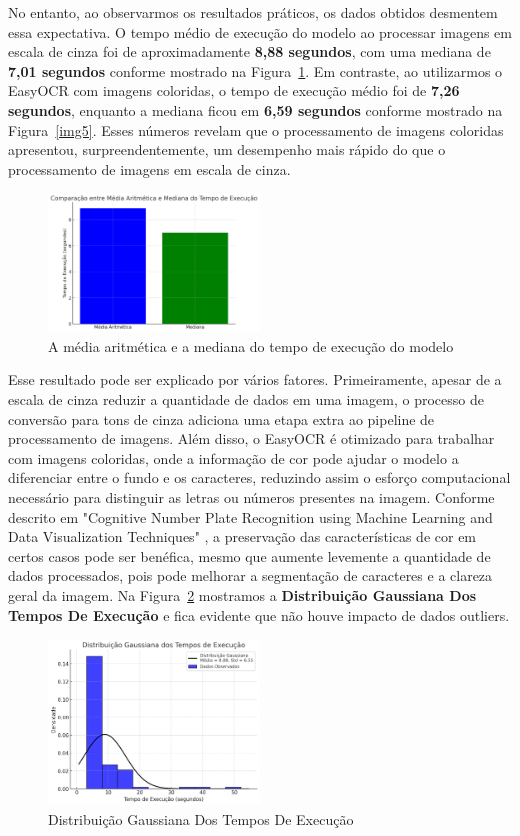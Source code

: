 \documentclass[conference]{IEEEtran}
\begin{document}
No entanto, ao observarmos os resultados práticos, os dados obtidos desmentem essa expectativa. O tempo médio de execução do modelo ao processar imagens em escala de cinza foi de aproximadamente \textbf{8,88 segundos}, com uma mediana de \textbf{7,01 segundos} conforme mostrado na Figura~\ref{img8}. Em contraste, ao utilizarmos o EasyOCR com imagens coloridas, o tempo de execução médio foi de \textbf{7,26 segundos}, enquanto a mediana ficou em \textbf{6,59 segundos} conforme mostrado na Figura~\ref{img5}. Esses números revelam que o processamento de imagens coloridas apresentou, surpreendentemente, um desempenho mais rápido do que o processamento de imagens em escala de cinza.

\begin{figure}[htbp]
	\centerline{\includegraphics[width=0.5\textwidth]{img8.png}}
	\caption{A média aritmética e a mediana do tempo de execução do modelo}
	\label{img8}
\end{figure}


Esse resultado pode ser explicado por vários fatores. Primeiramente, apesar de a escala de cinza reduzir a quantidade de dados em uma imagem, o processo de conversão para tons de cinza adiciona uma etapa extra ao pipeline de processamento de imagens. Além disso, o EasyOCR é otimizado para trabalhar com imagens coloridas, onde a informação de cor pode ajudar o modelo a diferenciar entre o fundo e os caracteres, reduzindo assim o esforço computacional necessário para distinguir as letras ou números presentes na imagem. Conforme descrito em "Cognitive Number Plate Recognition using Machine Learning and Data Visualization Techniques" \cite{b6}, a preservação das características de cor em certos casos pode ser benéfica, mesmo que aumente levemente a quantidade de dados processados, pois pode melhorar a segmentação de caracteres e a clareza geral da imagem. Na Figura~\ref{img9} mostramos a \textbf{Distribuição Gaussiana Dos Tempos De Execução} e fica evidente que não houve impacto de dados outliers.

\begin{figure}[htbp]
	\centerline{\includegraphics[width=0.5\textwidth]{img9.png}}
	\caption{Distribuição Gaussiana Dos Tempos De Execução}
	\label{img9}
\end{figure}
\end{document}
